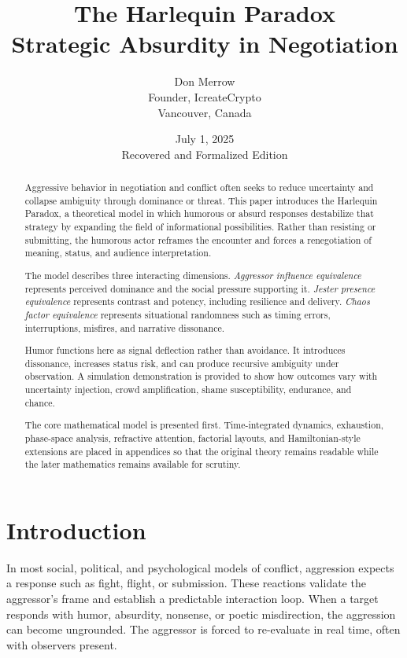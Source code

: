 \documentclass[11pt]{article}
\title{\textbf{The Harlequin Paradox}\\[0.35em]
\large Strategic Absurdity in Negotiation}
\author{
Don Merrow\\
Founder, IcreateCrypto\\
Vancouver, Canada
}
\date{July 1, 2025\\Recovered and Formalized Edition}
\begin{document}
\maketitle

\begin{abstract}
Aggressive behavior in negotiation and conflict often seeks to reduce uncertainty and collapse ambiguity through dominance or threat. This paper introduces the Harlequin Paradox, a theoretical model in which humorous or absurd responses destabilize that strategy by expanding the field of informational possibilities. Rather than resisting or submitting, the humorous actor reframes the encounter and forces a renegotiation of meaning, status, and audience interpretation.

The model describes three interacting dimensions. \emph{Aggressor influence equivalence} represents perceived dominance and the social pressure supporting it. \emph{Jester presence equivalence} represents contrast and potency, including resilience and delivery. \emph{Chaos factor equivalence} represents situational randomness such as timing errors, interruptions, misfires, and narrative dissonance.

Humor functions here as signal deflection rather than avoidance. It introduces dissonance, increases status risk, and can produce recursive ambiguity under observation. A simulation demonstration is provided to show how outcomes vary with uncertainty injection, crowd amplification, shame susceptibility, endurance, and chance.

The core mathematical model is presented first. Time-integrated dynamics, exhaustion, phase-space analysis, refractive attention, factorial layouts, and Hamiltonian-style extensions are placed in appendices so that the original theory remains readable while the later mathematics remains available for scrutiny.
\end{abstract}

\section{Introduction}

In most social, political, and psychological models of conflict, aggression expects a response such as fight, flight, or submission. These reactions validate the aggressor's frame and establish a predictable interaction loop. When a target responds with humor, absurdity, nonsense, or poetic misdirection, the aggression can become ungrounded. The aggressor is forced to re-evaluate in real time, often with observers present.
\end{document}
